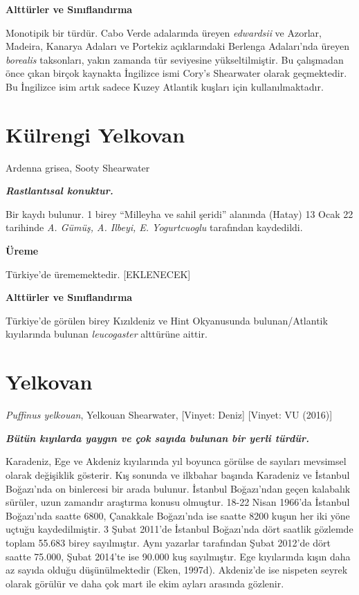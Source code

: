 \documentclass[
  a4paper,
  DIV=11,
  numbers=noendperiod]{scrreprt}
\begin{document}
\textbf{Alttürler ve Sınıflandırma}

Monotipik bir türdür. Cabo Verde adalarında üreyen \emph{edwardsii} ve
Azorlar, Madeira, Kanarya Adaları ve Portekiz açıklarındaki Berlenga
Adaları'nda üreyen \emph{borealis} taksonları, yakın zamanda tür
seviyesine yükseltilmiştir. Bu çalışmadan önce çıkan birçok kaynakta
İngilizce ismi Cory's Shearwater olarak geçmektedir. Bu İngilizce isim
artık sadece Kuzey Atlantik kuşları için kullanılmaktadır.

\section{Külrengi Yelkovan}\label{kuxfclrengi-yelkovan}

Ardenna grisea, Sooty Shearwater

\textbf{\emph{Rastlantısal konuktur.}}

Bir kaydı bulunur. 1 birey ``Milleyha ve sahil şeridi'' alanında (Hatay)
13 Ocak 22 tarihinde \emph{A. Gümüş, A. Ilbeyi, E. Yogurtcuoglu}
tarafından kaydedildi.

\textbf{Üreme}

Türkiye'de ürememektedir. {[}EKLENECEK{]}

\textbf{Alttürler ve Sınıflandırma}

Türkiye'de görülen birey Kızıldeniz ve Hint Okyanusunda bulunan/Atlantik
kıyılarında bulunan \emph{leucogaster} alttürüne aittir.

\section{Yelkovan}\label{yelkovan}

\emph{Puffinus yelkouan}, Yelkouan Shearwater, {[}Vinyet: Deniz{]}
{[}Vinyet: VU (2016){]}

\textbf{\emph{Bütün kıyılarda yaygın ve çok sayıda bulunan bir yerli
türdür.}}

Karadeniz, Ege ve Akdeniz kıyılarında yıl boyunca görülse de sayıları
mevsimsel olarak değişiklik gösterir. Kış sonunda ve ilkbahar başında
Karadeniz ve İstanbul Boğazı'nda on binlercesi bir arada bulunur.
İstanbul Boğazı'ndan geçen kalabalık sürüler, uzun zamandır araştırma
konusu olmuştur. 18-22 Nisan 1966'da İstanbul Boğazı'nda saatte 6800,
Çanakkale Boğazı'nda ise saatte 8200 kuşun her iki yöne uçtuğu
kaydedilmiştir. 3 Şubat 2011'de İstanbul Boğazı'nda dört saatlik
gözlemde toplam 55.683 birey sayılmıştır. Aynı yazarlar tarafından Şubat
2012'de dört saatte 75.000, Şubat 2014'te ise 90.000 kuş sayılmıştır.
Ege kıyılarında kışın daha az sayıda olduğu düşünülmektedir (Eken,
1997d). Akdeniz'de ise nispeten seyrek olarak görülür ve daha çok mart
ile ekim ayları arasında gözlenir.
\end{document}
